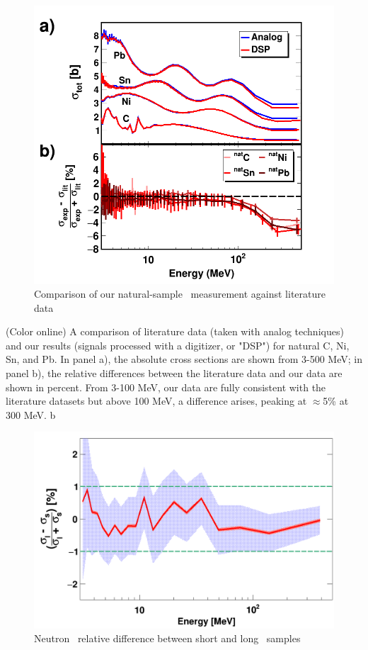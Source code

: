 \begin{figure}
    \includegraphics[scale=0.5]{figures/literatureBenchmarking.png}
    \caption{Comparison of our natural-sample \tot\ measurement against literature data}
    \label{LiteratureBenchmarking}
\end{figure}

(Color online) A comparison of literature data (taken with analog
    techniques) and our results (signals processed with a digitizer, or "DSP")
    for natural C, Ni, Sn, and Pb. In panel a), the absolute cross sections are shown from
    3-500 MeV; in panel b), the relative differences between the literature data and
    our data are shown in percent. From 3-100 MeV, our data are fully consistent with the
    literature datasets but above 100 MeV, a difference arises, peaking at
    $\approx$5\% at 300 MeV.
b

\begin{figure}
    \includegraphics[scale=0.30]{figures/relativeDiff_longCarbonShortCarbon.png}
    \caption{Neutron \tot\ relative difference between short and long \cNat\ samples}
    \label{CarbonBenchmarking}
\end{figure}

